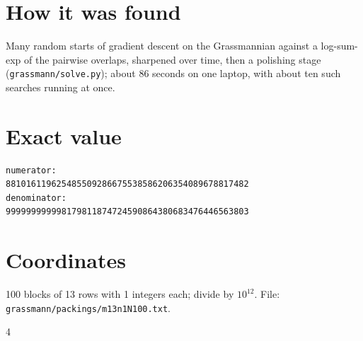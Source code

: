 \documentclass[11pt,a4paper]{article}
\begin{document}
\section{How it was found}
Many random starts of gradient descent on the Grassmannian against a log-sum-exp of the pairwise overlaps, sharpened over time, then a polishing stage (\texttt{grassmann/solve.py}); about 86 seconds on one laptop, with about ten such searches running at once.


\appendix
\section{Exact value}
{\small
\begin{verbatim}
numerator:
881016119625485509286675538586206354089678817482
denominator:
999999999998179811874724590864380683476446563803
\end{verbatim}}

\section{Coordinates}
100 blocks of 13 rows with 1 integers each; divide by $10^{12}$. File: \texttt{grassmann/packings/m13n1N100.txt}.
{\tiny
\begin{multicols}{4}
\end{multicols}}
\end{document}
